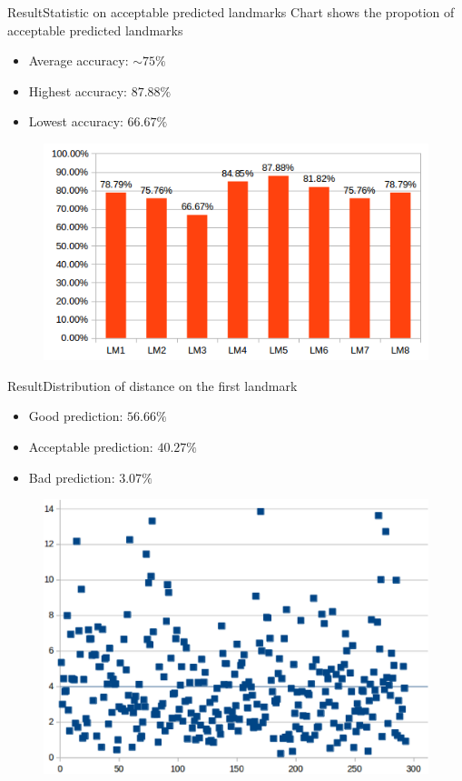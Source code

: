 \documentclass[10pt]{beamer}
\begin{document}
\begin{frame}{Result}{Statistic on acceptable predicted landmarks}
Chart shows the propotion of acceptable predicted landmarks
\footnotesize{
	\begin{itemize}
		\item Average accuracy: $\sim 75\%$
		\item Highest accuracy: $87.88\%$
		\item Lowest accuracy: $66.67\%$
	\end{itemize}
	}
	\begin{figure}[htbp]
		\centering
		\includegraphics[scale=.6]{images/chart2}	
	\end{figure}
\end{frame}
\begin{frame}{Result}{Distribution of distance on the first landmark}
\small{
	\begin{itemize}
		\item Good prediction: $56.66\%$
		\item Acceptable prediction: $40.27\%$
		\item Bad prediction: $3.07\%$
	\end{itemize}
	}
	\begin{figure}[htbp]
		\centering
		\includegraphics[scale=.3]{images/statistic}	
	\end{figure}
\end{frame}
\end{document}
